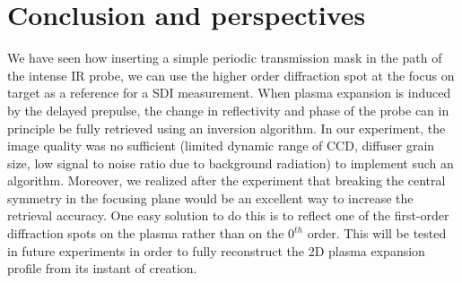 \section{Conclusion and perspectives}

We have seen how inserting a simple periodic transmission mask in the path of the intense IR probe, we can use the higher order diffraction spot at the focus on target as a reference for a SDI measurement. When plasma expansion is induced by the delayed prepulse, the change in reflectivity and phase of the probe can in principle be fully retrieved using an inversion algorithm. In our experiment, the image quality was no sufficient (limited dynamic range of CCD, diffuser grain size, low signal to noise ratio due to background radiation) to implement such an algorithm. Moreover, we realized after the experiment that breaking the central symmetry in the focusing plane would be an excellent way to increase the retrieval accuracy. One easy solution to do this is to reflect one of the first-order diffraction spots on the plasma rather than on the $0^{th}$ order. 
This will be tested in future experiments in order to fully reconstruct the 2D plasma expansion profile from its instant of creation.
























